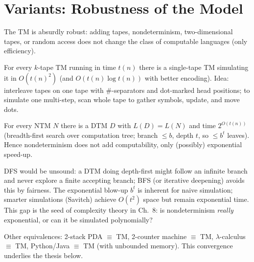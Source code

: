 \section{Variants: Robustness of the Model}
\label{sec:tm-variants}
The TM is absurdly robust: adding tapes, nondeterminism, two-dimensional tapes, or random access does not change the class of computable languages (only efficiency).

\begin{theorem}
For every $k$-tape TM running in time $t(n)$ there is a single-tape TM simulating it in $O(t(n)^2)$ (and $O(t(n)\log t(n))$ with better encoding). Idea: interleave tapes on one tape with $\#$-separators and dot-marked head positions; to simulate one multi-step, scan whole tape to gather symbols, update, and move dots.
\end{theorem}

\begin{theorem}
For every NTM $N$ there is a DTM $D$ with $L(D)=L(N)$ and time $2^{O(t(n))}$ (breadth-first search over computation tree; branch $\le b$, depth $t$, so $\le b^t$ leaves). Hence nondeterminism does not add computability, only (possibly) exponential speed-up.
\end{theorem}
DFS would be unsound: a DTM doing depth-first might follow an infinite branch and never explore a finite accepting branch; BFS (or iterative deepening) avoids this by fairness.
The exponential blow-up $b^{t}$ is inherent for naive simulation; smarter simulations (Savitch) achieve $O(t^2)$ space but remain exponential time.
This gap is the seed of complexity theory in Ch.~8: is nondeterminism \emph{really} exponential, or can it be simulated polynomially?

Other equivalences: 2-stack PDA $\equiv$ TM, 2-counter machine $\equiv$ TM, $\lambda$-calculus $\equiv$ TM, Python/Java $\equiv$ TM (with unbounded memory). This convergence underlies the thesis below.

